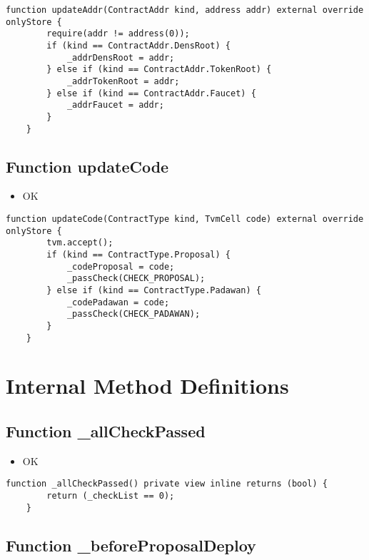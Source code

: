\begin{lstlisting}[firstnumber=174]
    function updateAddr(ContractAddr kind, address addr) external override onlyStore {
        require(addr != address(0));
        if (kind == ContractAddr.DensRoot) {
            _addrDensRoot = addr;
        } else if (kind == ContractAddr.TokenRoot) {
            _addrTokenRoot = addr;
        } else if (kind == ContractAddr.Faucet) {
            _addrFaucet = addr;
        }
    }
\end{lstlisting}

\subsection{Function updateCode}

\begin{itemize}
\item OK
\end{itemize}

\begin{lstlisting}[firstnumber=185]
    function updateCode(ContractType kind, TvmCell code) external override onlyStore {
        tvm.accept();
        if (kind == ContractType.Proposal) {
            _codeProposal = code;
            _passCheck(CHECK_PROPOSAL);
        } else if (kind == ContractType.Padawan) {
            _codePadawan = code;
            _passCheck(CHECK_PADAWAN);
        }
    }
\end{lstlisting}

\section{Internal Method Definitions}


\subsection{Function \_{}allCheckPassed}

\begin{itemize}
\item OK
\end{itemize}

\begin{lstlisting}[firstnumber=62]
    function _allCheckPassed() private view inline returns (bool) {
        return (_checkList == 0);
    }
\end{lstlisting}

\subsection{Function \_{}beforeProposalDeploy}

